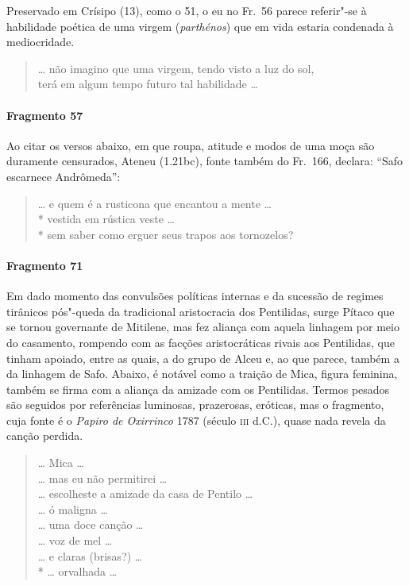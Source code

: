 {\small Preservado em Crísipo (13), como o 51, o eu no Fr.~56 parece referir"-se à habilidade
poética de uma virgem (\textit{parthénos}) que em vida estaria condenada à
mediocridade.}

\begin{verse}
\ldots{} não imagino que uma virgem, tendo visto \qb{}a luz do sol,\\
terá em algum tempo futuro tal habilidade \ldots{}
\end{verse}

\paragraph{Fragmento 57}

{\small Ao citar os versos abaixo, em que roupa, atitude e modos de uma moça são
duramente censurados, Ateneu (1.21bc), fonte também do Fr.~166, declara: ``Safo
escarnece Andrômeda”:}

\begin{verse}
\ldots{} e quem é a rusticona que encantou a \qb{}mente \ldots{}\\*
vestida em rústica veste \ldots{}\\*
sem saber como erguer seus trapos aos \qb{}tornozelos?
\end{verse}

\paragraph{Fragmento 71}

{\small Em dado momento das convulsões políticas internas e da sucessão de regimes
tirânicos pós"-queda da tradicional aristocracia dos Pentilidas, surge Pítaco que se tornou governante de
Mitilene, mas fez aliança com aquela linhagem por meio do casamento,
rompendo com as facções aristocráticas rivais aos Pentilidas, que tinham apoiado, entre as quais, a
do grupo de Alceu e, ao que parece, também a da linhagem de Safo. Abaixo, é notável como a traição de 
Mica, figura feminina, também se firma com a aliança da amizade com os Pentilidas. Termos
pesados são seguidos por referências luminosas, prazerosas, eróticas, mas o
fragmento, cuja fonte é o \textit{Papiro de Oxirrinco} 1787 (século \textsc{iii} d.C.),
quase nada revela da canção perdida.}

\begin{verse}
\ldots{} Mica \ldots{}\\
\ldots{} mas eu não permitirei \ldots{}\\
\ldots{} escolheste a amizade da casa de Pentilo \ldots{}\\
\ldots{} ó maligna \ldots{}\\
\ldots{} uma doce canção \ldots{}\\
\ldots{} voz de mel \ldots{}\\
\ldots{} e claras (brisas?) \ldots{}\\*
\ldots{} orvalhada \ldots{}
\end{verse}

